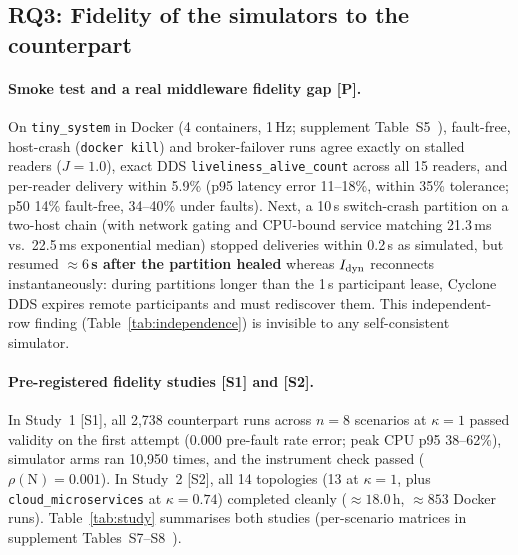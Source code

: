 \subsection{RQ3: Fidelity of the simulators to the counterpart}
\label{sec:rq3}

\paragraph{Smoke test and a real middleware fidelity gap [P].} On \texttt{tiny\_system} in Docker (4 containers, 1\,Hz; supplement Table~S5~\citealp{sag-software}), fault-free, host-crash (\texttt{docker kill}) and broker-failover runs agree exactly on stalled readers ($J = 1.0$), exact DDS \texttt{liveliness\_\allowbreak alive\_\allowbreak count} across all 15 readers, and per-reader delivery within 5.9\% (p95 latency error 11--18\%, within 35\% tolerance; p50 14\% fault-free, 34--40\% under faults). Next, a 10\,s switch-crash partition on a two-host chain (with network gating and CPU-bound service matching 21.3\,ms vs.\ 22.5\,ms exponential median) stopped deliveries within 0.2\,s as simulated, but resumed \textbf{$\approx 6$\,s after the partition healed} whereas $I_{\mathrm{dyn}}$ reconnects instantaneously: during partitions longer than the 1\,s participant lease, Cyclone DDS expires remote participants and must rediscover them. This independent-row finding (Table~\ref{tab:independence}) is invisible to any self-consistent simulator.

\paragraph{Pre-registered fidelity studies [S1] and [S2].} In Study~1 [S1], all 2,738 counterpart runs across $n = 8$ scenarios at $\kappa = 1$ passed validity on the first attempt (0.000 pre-fault rate error; peak CPU p95 38--62\%), simulator arms ran 10,950 times, and the instrument check passed ($\rho(\mathrm{N}) = 0.001$). In Study~2 [S2], all 14 topologies (13 at $\kappa = 1$, plus \texttt{cloud\_microservices} at $\kappa = 0.74$) completed cleanly ($\approx 18.0$\,h, $\approx 853$ Docker runs). Table~\ref{tab:study} summarises both studies (per-scenario matrices in supplement Tables~S7--S8~\citealp{sag-software}).

